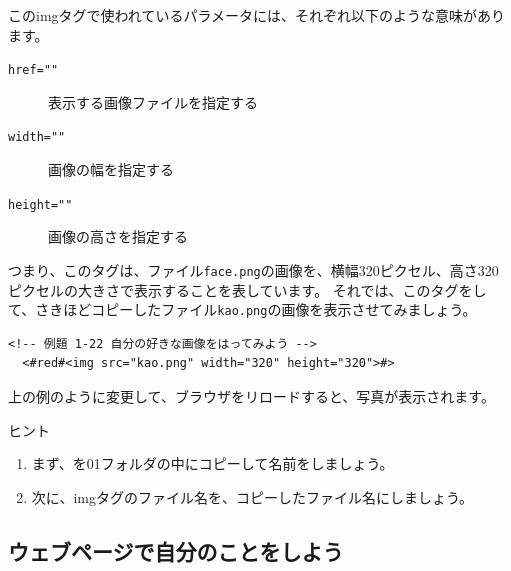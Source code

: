 \noindent%
このimgタグで使われているパラメータには、それぞれ以下のような意味があります。

\begin{description}
  \item[\texttt{href=""}]  表示する画像ファイルを指定する
  \item[\texttt{width=""}]  画像の幅を指定する
  \item[\texttt{height=""}]  画像の高さを指定する
\end{description}

\noindent%
つまり、このタグは、ファイル\texttt{face.png}の画像を、横幅320ピクセル、高さ320ピクセルの大きさで表示することを表しています。
それでは、このタグをして、さきほどコピーしたファイル\texttt{kao.png}の画像を表示させてみましょう。
\bigskip


\begin{lstlisting}[caption=\ruby{画像}{がぞう}の表示（\ruby{編集}{へんしゅう}後）,label=pwdtest,firstnumber=1]
  <!-- 例題 1-22 自分の好きな画像をはってみよう -->
  <#red#<img src="kao.png" width="320" height="320">#> 
\end{lstlisting}


\noindent%
上の例のように変更して、ブラウザをリロードすると、写真が表示されます。
\bigskip


\begin{tcolorbox}[title=\useOmetoi,breakable]
  \begin{enumerate}
    ヒント
    \begin{enumerate}
      \item まず、を01フォルダの中にコピーして名前をしましょう。
      \item 次に、imgタグのファイル名を、コピーしたファイル名にしましょう。
    \end{enumerate} 
    \vspace{0.5cm}
  \end{enumerate}
\end{tcolorbox}
\clearpage



%
%
\subsection{ウェブページで自分のことをしよう}

